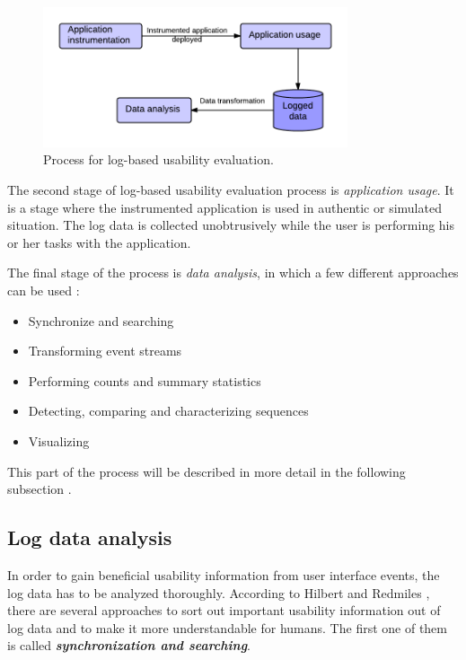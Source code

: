 \documentclass[12pt,a4paper,oneside,pdftex]{report}
\begin{document}
\begin{figure}[H]
  	\centering
  	\includegraphics[width=0.8\textwidth]{./images/logging_usability_process.png}
  	\caption{Process for log-based usability evaluation. \cite{RefWorks:24}}
	\label{fig:logging_usability_process}
\end{figure}

The second stage of log-based usability evaluation process is \emph{application usage}. It is a stage where the instrumented application is used in authentic or simulated situation. The log data is collected unobtrusively while the user is performing his or her tasks with the application. \cite{RefWorks:24}

The final stage of the process is \emph{data analysis}, in which a few different approaches can be used \cite{RefWorks:24, RefWorks:25}:
\begin{itemize}
  \item Synchronize and searching
  \item Transforming event streams
  \item Performing counts and summary statistics
  \item Detecting, comparing and characterizing sequences 
  \item Visualizing
\end{itemize}
This part of the process will be described in more detail in the following subsection .



\subsection{Log data analysis}
\label{sec:analysis}
 In order to gain beneficial usability information from user interface events, the log data has to be analyzed thoroughly. According to  Hilbert and Redmiles \cite{RefWorks:25}, there are several approaches to sort out important usability information out of log data and to make it more understandable for humans.
The first one of them is called \textbf{\emph{synchronization and searching}}. 
\end{document}
